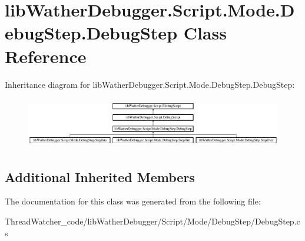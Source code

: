 \hypertarget{classlib_wather_debugger_1_1_script_1_1_mode_1_1_debug_step_1_1_debug_step}{\section{lib\+Wather\+Debugger.\+Script.\+Mode.\+Debug\+Step.\+Debug\+Step Class Reference}
\label{classlib_wather_debugger_1_1_script_1_1_mode_1_1_debug_step_1_1_debug_step}
}
Inheritance diagram for lib\+Wather\+Debugger.\+Script.\+Mode.\+Debug\+Step.\+Debug\+Step\+:\begin{figure}[H]
\begin{center}
\leavevmode
\includegraphics[height=2.235529cm]{classlib_wather_debugger_1_1_script_1_1_mode_1_1_debug_step_1_1_debug_step}
\end{center}
\end{figure}
\subsection*{Additional Inherited Members}


The documentation for this class was generated from the following file\+:\begin{DoxyCompactItemize}
\item 
Thread\+Watcher\+\_\+code/lib\+Wather\+Debugger/\+Script/\+Mode/\+Debug\+Step/Debug\+Step.\+cs\end{DoxyCompactItemize}

